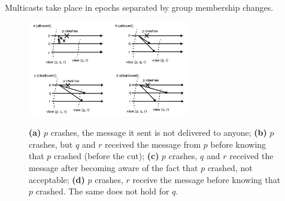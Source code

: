 \documentclass[10pt,a4paper]{article}
\begin{document}
Multicasts take place in epochs separated by group membership changes.
\begin{figure}[h!]
\hfill \includegraphics[width=200pt]{images/virtual-synchrony-ex.png}\hspace*{\fill}
  \label{fig:virtual-synchrony-ex}
  \caption{\textbf{(a)} $p$ crashes, the message it sent is not delivered to anyone; \textbf{(b)} $p$ crashes, but $q$ and $r$ received the message from $p$ before knowing that $p$ crashed (before the cut); \textbf{(c)} $p$ crashes, $q$ and $r$ received the message after becoming aware of the fact that $p$ crashed, not acceptable; \textbf{(d)} $p$ crashes, $r$ receive the message before knowing that $p$ crashed. The same does not hold for $q$.}
\end{figure}
\end{document}
